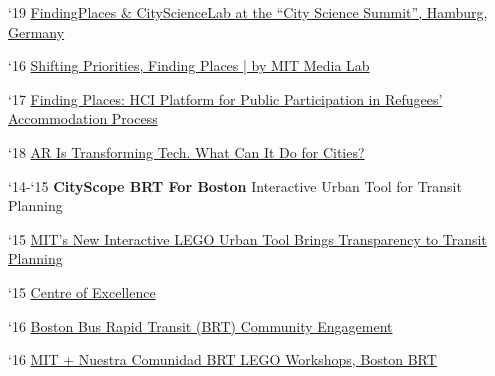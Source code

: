 \begin{tablist}
    \begin{tablist}

        \item[`19] \tab \href{https://www.youtube.com/watch?v=PZg6A_A65lQ}{FindingPlaces \& CityScienceLab at the “City Science Summit”, Hamburg, Germany}

        \item[`16] \tab  \href{https://medium.com/mit-media-lab/shifting-priorities-finding-places-9ad3bdbe38b8}{Shifting Priorities, Finding Places | by MIT Media Lab}

        \item[`17] \tab \href{https://www.media.mit.edu/publications/finding-places/}{Finding Places: HCI Platform for Public Participation in Refugees’ Accommodation Process}

        \item[`18] \tab  \href{https://datasmart.ash.harvard.edu/news/article/ar-transforming-tech-what-can-it-do-cities}{AR Is Transforming Tech. What Can It Do for Cities?}

    \end{tablist}


    \item[`14-`15] \tab \textbf{CityScope BRT For Boston} {Interactive Urban Tool for Transit Planning}

    \begin{tablist}

        \item[`15] \tab  \href{https://www.bloomberg.com/news/articles/2015-10-16/mit-s-new-interactive-lego-urban-tool-brings-transparency-to-transit-planning}
        {MIT's New Interactive LEGO Urban Tool Brings Transparency to Transit Planning}

        \item[`15] \tab  \href{http://www.brt.cl/new-tools-for-a-new-era-of-open-transportation-planning/}
        {Centre of Excellence}

        \item[`16] \tab  \href{https://www.media.mit.edu/projects/CityscopeBostonBRT/overview/}
        {Boston Bus Rapid Transit (BRT) Community Engagement}

        \item[`16] \tab  \href{http://www.bostonbrt.org/mit-nuestra-comunidad-brt-lego-workshops}
        {MIT + Nuestra Comunidad BRT LEGO Workshops, Boston BRT}

    \end{tablist}


\end{tablist}
